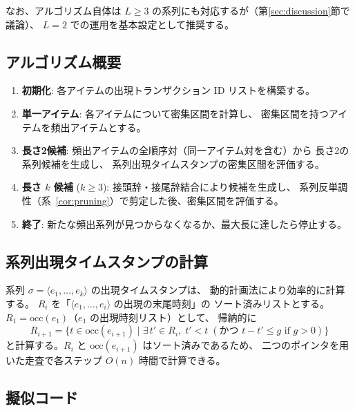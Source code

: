 \documentclass[11pt,a4paper]{article}
\begin{document}
なお、アルゴリズム自体は $L \ge 3$ の系列にも対応するが（第\ref{sec:discussion}節で議論）、
$L=2$ での運用を基本設定として推奨する。

\subsection{アルゴリズム概要}

\begin{enumerate}[leftmargin=2em]
  \item \textbf{初期化}: 各アイテムの出現トランザクション ID リストを構築する。
  \item \textbf{単一アイテム}: 各アイテムについて密集区間を計算し、
        密集区間を持つアイテムを頻出アイテムとする。
  \item \textbf{長さ2候補}: 頻出アイテムの全順序対（同一アイテム対を含む）から
        長さ2の系列候補を生成し、
        系列出現タイムスタンプの密集区間を評価する。
  \item \textbf{長さ $k$ 候補} ($k \ge 3$): 接頭辞・接尾辞結合により候補を生成し、
        系列反単調性（系~\ref{cor:pruning}）で剪定した後、密集区間を評価する。
  \item \textbf{終了}: 新たな頻出系列が見つからなくなるか、最大長に達したら停止する。
\end{enumerate}

\subsection{系列出現タイムスタンプの計算}

系列 $\sigma = \langle e_1, \ldots, e_k \rangle$ の出現タイムスタンプは、
動的計画法により効率的に計算する。
$R_i$ を「$\langle e_1, \ldots, e_i \rangle$ の出現の末尾時刻」の
ソート済みリストとする。
$R_1 = \mathrm{occ}(e_1)$（$e_1$ の出現時刻リスト）として、
帰納的に
\[
  R_{i+1} = \{t \in \mathrm{occ}(e_{i+1}) \mid
  \exists\, t' \in R_i,\; t' < t \;(\text{かつ } t - t' \le g \text{ if } g > 0)\}
\]
と計算する。$R_i$ と $\mathrm{occ}(e_{i+1})$ はソート済みであるため、
二つのポインタを用いた走査で各ステップ $O(n)$ 時間で計算できる。

\subsection{擬似コード}
\end{document}

